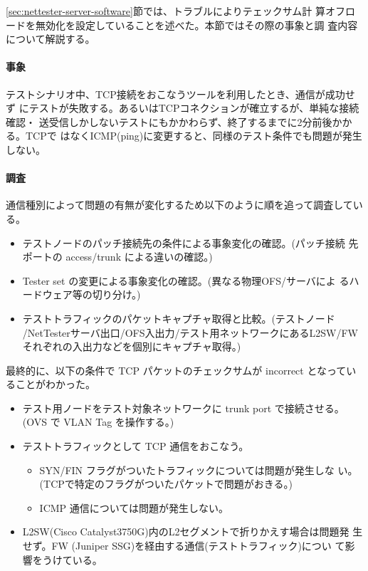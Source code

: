 \ref{sec:nettester-server-software}節では、トラブルによりテェックサム計
算オフロードを無効化を設定していることを述べた。本節ではその際の事象と調
査内容について解説する。

    \paragraph{事象}
テストシナリオ中、TCP接続をおこなうツールを利用したとき、通信が成功せず
にテストが失敗する。あるいはTCPコネクションが確立するが、単純な接続確認・
送受信しかしないテストにもかかわらず、終了するまでに2分前後かかる。TCPで
はなくICMP(ping)に変更すると、同様のテスト条件でも問題が発生しない。

    \paragraph{調査}
通信種別によって問題の有無が変化するため以下のように順を追って調査している。
\begin{itemize}
 \item テストノードのパッチ接続先の条件による事象変化の確認。(パッチ接続
       先ポートの access/trunk による違いの確認。)
 \item Tester set の変更による事象変化の確認。(異なる物理OFS/サーバによ
       るハードウェア等の切り分け。)
 \item テストトラフィックのパケットキャプチャ取得と比較。(テストノード
       /NetTesterサーバ出口/OFS入出力/テスト用ネットワークにあるL2SW/FW
       それぞれの入出力などを個別にキャプチャ取得。)
\end{itemize}

最終的に、以下の条件で TCP パケットのチェックサムが incorrect となってい
ることがわかった。
\begin{itemize}
 \item テスト用ノードをテスト対象ネットワークに trunk port で接続させる。
       (OVS で VLAN Tag を操作する。)
 \item テストトラフィックとして TCP 通信をおこなう。
       \begin{itemize}
        \item SYN/FIN フラグがついたトラフィックについては問題が発生しな
              い。(TCPで特定のフラグがついたパケットで問題がおきる。)
        \item ICMP 通信については問題が発生しない。
       \end{itemize}
 \item L2SW(Cisco Catalyst3750G)内のL2セグメントで折りかえす場合は問題発
       生せず。FW (Juniper SSG)を経由する通信(テストトラフィック)につい
       て影響をうけている。
\end{itemize}

